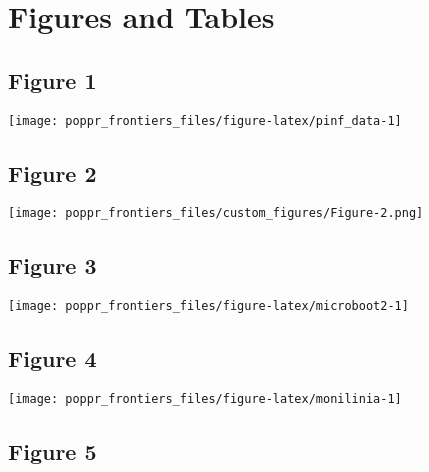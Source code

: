 \documentclass{frontiersSCNS} %
\newenvironment{CodeChunk}{}{}
\begin{document}
\section*{Figures and Tables}\label{figures-and-tables}

\subsection*{Figure 1}\label{figure-1}

\begin{CodeChunk}

\texttt{[image: poppr\_frontiers\_files/figure-latex/pinf\_data-1]} \end{CodeChunk}

\subsection*{Figure 2}\label{figure-2}

\texttt{[image: poppr\_frontiers\_files/custom\_figures/Figure-2.png]}

\subsection*{Figure 3}\label{figure-3}

\begin{CodeChunk}

\texttt{[image: poppr\_frontiers\_files/figure-latex/microboot2-1]} \end{CodeChunk}

\subsection*{Figure 4}\label{figure-4}

\begin{CodeChunk}

\texttt{[image: poppr\_frontiers\_files/figure-latex/monilinia-1]} \end{CodeChunk}

\subsection*{Figure 5}\label{figure-5}
\end{document}
